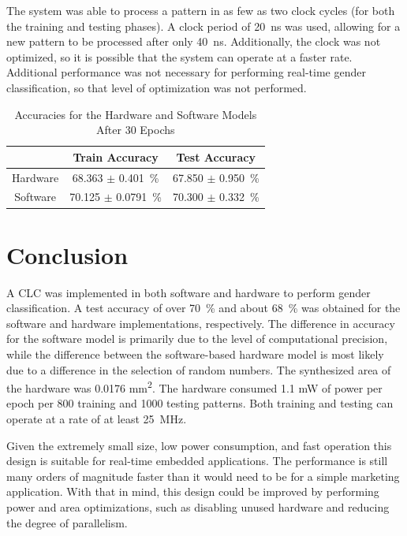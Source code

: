 \documentclass[10pt,journal]{IEEEtran}
\begin{document}
		The system was able to process a pattern in as few as two clock cycles (for both the training and testing phases). A clock period of 20~ns was used, allowing for a new pattern to be processed after only 40~ns. Additionally, the clock was not optimized, so it is possible that the system can operate at a faster rate. Additional performance was not necessary for performing real-time gender classification, so that level of optimization was not performed.
		
		\begin{table}[!t]
			\renewcommand{\arraystretch}{1.3}
			\caption{Accuracies for the Hardware and Software Models After 30 Epochs}
			\label{table:accuracy_results}
			\centering
			\begin{tabular}{ccc}
				\hline
				         & Train Accuracy           & Test Accuracy           \\
				\hline
				Hardware & 68.363 \(\pm\) 0.401~\%  & 67.850 \(\pm\) 0.950~\% \\
				Software & 70.125 \(\pm\) 0.0791~\% & 70.300 \(\pm\) 0.332~\% \\
				\hline
			\end{tabular}
		\end{table}		
	
	\section{Conclusion}
		A CLC was implemented in both software and hardware to perform gender classification. A test accuracy of over 70~\% and about 68~\% was obtained for the software and hardware implementations, respectively. The difference in accuracy for the software model is primarily due to the level of computational precision, while the difference between the software-based hardware model is most likely due to a difference in the selection of random numbers. The synthesized area of the hardware was 0.0176 mm\textsuperscript{2}. The hardware consumed 1.1 mW of power per epoch per 800 training and 1000 testing patterns. Both training and testing can operate at a rate of at least 25~MHz.
		
		Given the extremely small size, low power consumption, and fast operation this design is suitable for real-time embedded applications. The performance is still many orders of magnitude faster than it would need to be for a simple marketing application. With that in mind, this design could be improved by performing power and area optimizations, such as disabling unused hardware and reducing the degree of parallelism.
	
	
		
	
\end{document}
